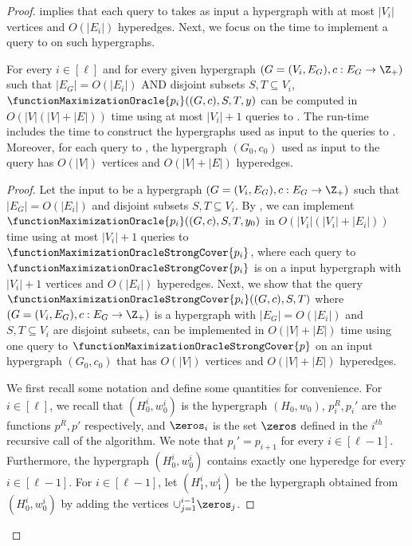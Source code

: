 \begin{proof}
 implies that each query to  takes as input a hypergraph 
with at most $|V_i|$ vertices and $O(|E_i|)$ hyperedges.  
Next, we focus on the time to implement a query to  on such hypergraphs. 

\begin{claim}\label{claim:WeakToStrong:p_i-oracle-using-p-oracle}
For every $i\in [\ell]$ and for every given hypergraph $(G = (V_i, E_G), c:E_G\rightarrow\Z_+)$ such that $|E_G| = O(|E_i|)$ AND disjoint subsets $S, T\subseteq V_i$, $\functionMaximizationOracle{p_i}((G, c), S, T, y)$ can be computed in $O(|V|(|V| + |E|))$ time using at most $|V_i|+1$ queries to . The run-time includes the time to construct the hypergraphs used as input to the queries to . Moreover, for each query to , the hypergraph $(G_0, c_0)$ used as input to the query has $O(|V|)$ vertices and $O(|V|+|E|)$ hyperedges.
\end{claim}
\begin{proof}
Let the input to  be a hypergraph $(G = (V_i, E_G), c:E_G\rightarrow\Z_+)$ such that $|E_G| = O(|E_i|)$ and disjoint subsets $S, T\subseteq V_i$. By , we can implement $\functionMaximizationOracle{p_i}((G, c), S, T, y_0)$ in $O(|V_i|(|V_i| + |E_i|))$ time using at most $|V_i|+1$ queries to $\functionMaximizationOracleStrongCover{p_i}$, where each query to $\functionMaximizationOracleStrongCover{p_i}$ is on a input hypergraph with $|V_i|+1$ vertices and $O(|E_i|)$ hyperedges. Next, we show that the query $\functionMaximizationOracleStrongCover{p_i}((G, c), S, T)$ where $(G = (V_i, E_G), c:E_G\rightarrow\Z_+)$ is a hypergraph with $|E_G| = O(|E_i|)$ and $S, T\subseteq V_i$ are disjoint subsets, can be implemented in $O(|V| + |E|)$ time using one query to  $\functionMaximizationOracleStrongCover{p}$ on an input hypergraph $(G_0, c_0)$ that has $O(|V|)$ vertices and $O(|V|+|E|)$ hyperedges. 

We first recall some notation and define some quantities for convenience. For $i\in [\ell]$, we recall that $(H_0^i, w_0^i)$ is the hypergraph $(H_0, w_0)$, $p^R_i, p_i'$ are the functions $p^R, p'$ respectively, and $\zeros_i$ is the set $\zeros$ defined in the $i^{th}$ recursive call of the algorithm. We note that $p_i' =p_{i+1}$ for every $i\in [\ell-1]$. Furthermore, the hypergraph $(H_0^i, w_0^i)$ contains exactly one hyperedge for every $i\in [\ell-1]$. 
For $i\in [\ell-1]$, let $(H_1^i, w_1^i)$ be the hypergraph obtained from $(H_0^i, w_0^i)$ by adding the vertices $\cup_{j=1}^{i-1}\zeros_{j}$.


\end{proof}
\end{proof}
